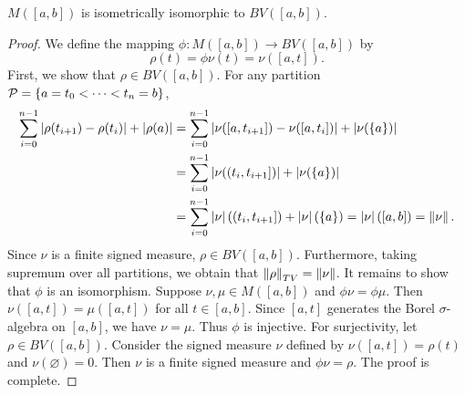 \begin{theorem}\label{thm:M_BV}
    $M([a,b])$ is isometrically isomorphic to $BV([a,b])$. 
\end{theorem}
\begin{proof}
    We define the mapping $\phi:M([a,b])\to BV([a,b])$ by 
    \begin{equation*}
        \rho(t) = \phi\nu(t) = \nu([a,t]).
    \end{equation*}
    First, we show that $\rho\in BV([a,b])$. For any partition 
    $\mathcal{P} = \left\{ {a=t_0<\cdots<t_n=b} \right\}$, 
    \begin{equation*}
        \begin{split}
            \sum_{i=0}^{n-1} \left\lvert {\rho(t_{i+1})-\rho(t_i)} \right\rvert + \left\lvert {\rho(a)} \right\rvert 
            &= \sum_{i=0}^{n-1} \left\lvert {\nu([a,t_{i+1}])-\nu([a,t_i])} \right\rvert + \left\lvert {\nu(\left\{ {a} \right\})} \right\rvert \\
            &= \sum_{i=0}^{n-1} \left\lvert {\nu((t_i,t_{i+1}])} \right\rvert + \left\lvert {\nu(\left\{ {a} \right\})} \right\rvert \\
            &= \sum_{i=0}^{n-1} \left\lvert {\nu} \right\rvert((t_i,t_{i+1}]) + \left\lvert {\nu} \right\rvert(\left\{ {a} \right\}) 
            = \left\lvert {\nu} \right\rvert([a,b]) = \left\lVert {\nu} \right\rVert.
        \end{split}
    \end{equation*}
    Since $\nu$ is a finite signed measure, $\rho\in BV([a,b])$. 
    Furthermore, taking supremum over all partitions, we obtain 
    that $\left\lVert {\rho} \right\rVert_{TV} = \left\lVert {\nu} \right\rVert$. It remains to show that 
    $\phi$ is an isomorphism. Suppose $\nu,\mu\in M([a,b])$ and 
    $\phi\nu = \phi\mu$. Then $\nu([a,t]) = \mu([a,t])$ for all 
    $t\in[a,b]$. Since $[a,t]$ generates the Borel $\sigma$-algebra 
    on $[a,b]$, we have $\nu = \mu$. Thus $\phi$ is injective. 
    For surjectivity, let $\rho\in BV([a,b])$. Consider the 
    signed measure $\nu$ defined by $\nu([a,t]) = \rho(t)$ and 
    $\nu(\varnothing) = 0$. Then $\nu$ is a finite signed measure 
    and $\phi\nu = \rho$. The proof is complete.
\end{proof}

